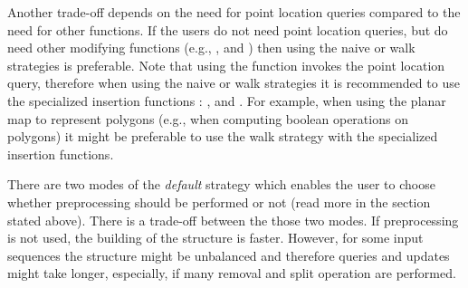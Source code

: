 \begin{ccAdvanced}
Another trade-off depends on the need for point location queries compared
to the need for other functions. If the users do not need point location 
queries, but do need other modifying functions (e.g., , 
 and ) then using the naive or walk strategies
is preferable. Note that using the  function invokes the
point location query, therefore when using the naive or walk strategies it
is recommended to use the specialized insertion functions : 
,  and 
.
For example, when using the planar map to represent polygons (e.g., when
computing boolean operations on polygons) it might be preferable to use
the walk strategy with the specialized insertion functions. 

There are two modes of the {\it default\/} strategy which enables the user
to choose whether preprocessing should be performed or not (read more in
the section stated above).
There is a trade-off between the those two modes. If
preprocessing is not used, the building of the structure is faster. However,
for some input sequences the structure might be unbalanced and therefore 
queries and updates might take longer, especially, if many removal and split 
operation are performed.
\end{ccAdvanced}

